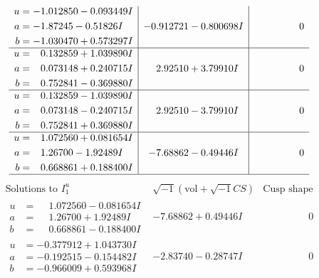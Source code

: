 \documentclass[1p]{elsarticle_modified}
\theoremstyle{definition}
\newcommand{\I}{\sqrt{-1}}
\begin{document}
$$\begin{array}{c|c|c}
\begin{aligned}
u &= -1.012850 - 0.093449 I \\
a &= -1.87245 - 0.51826 I \\
b &= -1.030470 + 0.573297 I\end{aligned}
 & -0.912721 - 0.800698 I & \phantom{-0.000000 } 0 \\ \hline\begin{aligned}
u &= \phantom{-}0.132859 + 1.039890 I \\
a &= \phantom{-}0.073148 + 0.240715 I \\
b &= \phantom{-}0.752841 - 0.369880 I\end{aligned}
 & \phantom{-}2.92510 + 3.79910 I & \phantom{-0.000000 } 0 \\ \hline\begin{aligned}
u &= \phantom{-}0.132859 - 1.039890 I \\
a &= \phantom{-}0.073148 - 0.240715 I \\
b &= \phantom{-}0.752841 + 0.369880 I\end{aligned}
 & \phantom{-}2.92510 - 3.79910 I & \phantom{-0.000000 } 0 \\ \hline\begin{aligned}
u &= \phantom{-}1.072560 + 0.081654 I \\
a &= \phantom{-}1.26700 - 1.92489 I \\
b &= \phantom{-}0.668861 + 0.188400 I\end{aligned}
 & -7.68862 - 0.49446 I & \phantom{-0.000000 } 0\\
 \hline 
 \end{array}$$\newpage$$\begin{array}{c|c|c}  
\text{Solutions to }I^u_{1}& \I (\text{vol} + \sqrt{-1}CS) & \text{Cusp shape}\\
 \hline 
\begin{aligned}
u &= \phantom{-}1.072560 - 0.081654 I \\
a &= \phantom{-}1.26700 + 1.92489 I \\
b &= \phantom{-}0.668861 - 0.188400 I\end{aligned}
 & -7.68862 + 0.49446 I & \phantom{-0.000000 } 0 \\ \hline\begin{aligned}
u &= -0.377912 + 1.043730 I \\
a &= -0.192515 - 0.154482 I \\
b &= -0.966009 + 0.593968 I\end{aligned}
 & -2.83740 - 0.28747 I & \phantom{-0.000000 } 0 \\ \hline\begin{aligned}

\end{aligned}
\end{array}$$
\end{document}
